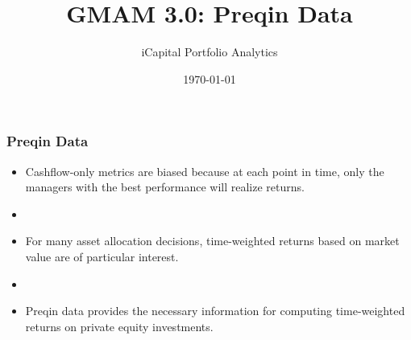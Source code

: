 \documentclass[10pt, compress]{beamer}
\author[Tepper]{iCapital Portfolio Analytics}
\title{\Large \bf GMAM 3.0: Preqin Data}
\date{\today}
\begin{document}
\newcommand{\tstar}{\ensuremath{^\text{***}}}
\newcommand{\dstar}{\ensuremath{^\text{**}}}
\newcommand{\ostar}{\ensuremath{^\text{*}}}
\maketitle





\begin{frame}[fragile]
\frametitle{Preqin Data} \label{fr:motivation}
\begin{itemize}
    \item Cashflow-only metrics are biased because at each point in time, only the managers with the best performance will realize returns.
    \item []
    \item For many asset allocation decisions, time-weighted returns based on market value are of particular interest.
    \item []
    \item Preqin data provides the necessary information for computing time-weighted returns on private equity investments.
\end{itemize}
\end{frame}
\end{document}

